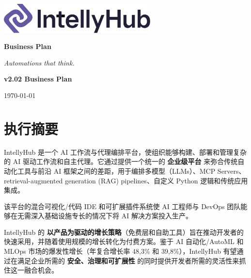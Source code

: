 \documentclass[11pt, a4paper, oneside]{article}
\begin{document}
\thispagestyle{empty} 
\begin{titlepage}
    \centering
    \vspace{1cm}
    
    \includegraphics[width=0.6\textwidth]{IntellyHub_Logo_Colored.png}
    
    \vspace{2.5cm}
    
    {\Huge\bfseries\color{PrimaryColor}Business Plan}
    
    \vspace{1.5cm}
    
    {\Large\itshape\lightfont Automations that think.}
    
    \vfill %
    
    {\large\bfseries\color{PrimaryColor}v2.02 \color{SecondaryColor}Business Plan}
    
    \vspace{0.5cm}
    
    {\large \today}
    
\end{titlepage}

\tableofcontents
\newpage


\section{执行摘要}
IntellyHub 是一个 AI 工作流与代理编排平台，使组织能够构建、部署和管理复杂的 AI 驱动工作流和自主代理。它通过提供一个统一的 \textbf{企业级平台} 来弥合传统自动化工具与前沿 AI 框架之间的差距，用于编排多模型（LLMs）、MCP Servers、retrieval-aug\-ment\-ed generation (RAG) pipelines、自定义 Python 逻辑和传统应用集成。

该平台的混合可视化/代码 IDE 和可扩展插件系统使 AI 工程师与 DevOps 团队能够在无需深入基础设施专长的情况下将 AI 解决方案投入生产。

IntellyHub 的 \textbf{以产品为驱动的增长策略}（免费层和自助工具）旨在推动开发者的快速采用，并随着使用规模的增长转化为付费方案。鉴于 AI 自动化/AutoML 和 MLOps 市场的爆发性增长（年复合增长率 48,3\%\cite{AIMarket} 和 39,8\%\cite{MLOpsMarket}），IntellyHub 有望通过在满足企业所需的 \textbf{安全、治理和可扩展性} 的同时提供开发者所需的灵活性来抓住这一融合机会。
\end{document}
